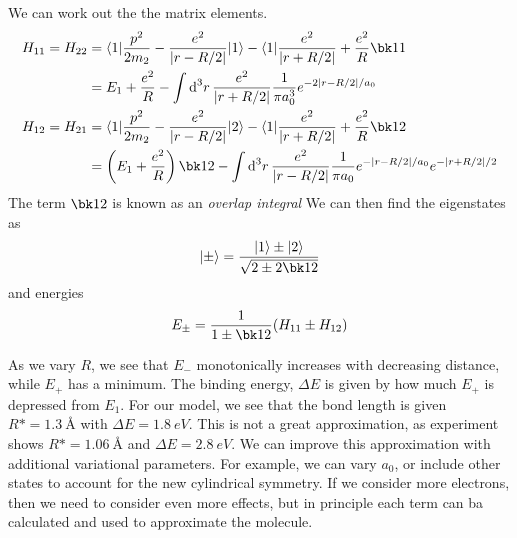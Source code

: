 We can work out the the matrix elements.
\begin{align*}
	H_{11} = H_{22} &= \b 1 \frac{p^2}{2m_2}-\frac{e^2}{\abs {r- R/2}}\k1 - \b{1}\frac{e^2}{\abs{r + R/2}} + \frac{e^2}{R}\bk11\\
			&=E_1+ \frac{e^2}{R} - \int\d[3]{r}\frac{e^2}{\abs{r+R/2}}\frac{1}{\pi a_0^3}e^{-2\abs{r-R/2}/a_0}\\
	H_{12}=H_{21}&= \b 1 \frac{p^2}{2m_2}-\frac{e^2}{\abs {r- R/2}}\k2 - \b{1}\frac{e^2}{\abs{r + R/2}} + \frac{e^2}{R}\bk12\\
		     &=\left(E_1+\frac{e^2}{R}\right)\bk12 - \int\d[3]{r}\frac{e^2}{\abs{r-R/2}}\frac{1}{\pi a_0} e^{-\abs{r-R/2}/a_0}e^{-\abs{r+R/2}/2}
\end{align*}
The term \(\bk12\) is known as an \emph{overlap integral} We can then find the eigenstates as
\begin{equation}
	\k\pm = \frac{\k1\pm\k2}{\sqrt{2\pm2\bk12}}
\end{equation}
and energies
\begin{equation}
	E_\pm = \frac{1}{1\pm \bk12}(H_{11}\pm H_{12})
\end{equation}

As we vary \(R\), we see that \(E_-\) monotonically increases with decreasing distance, while \(E_+\) has a minimum. The binding energy, \(\Delta E\) is given by how much \(E_+\) is depressed from \(E_1\). For our model, we see that the bond length is given \(R\ast = \SI{1.3}{\angstrom}\) with \(\Delta E = \SI{1.8}{eV}\). This is not a great approximation, as experiment shows \(R\ast = \SI{1.06}{\angstrom}\) and \(\Delta E = \SI{2.8}{eV}\). We can improve this approximation with additional variational parameters. For example, we can vary \(a_0\), or include other states to account for the new cylindrical symmetry. If we consider more electrons, then we need to consider even more effects, but in principle each term can ba calculated and used to approximate the molecule.


